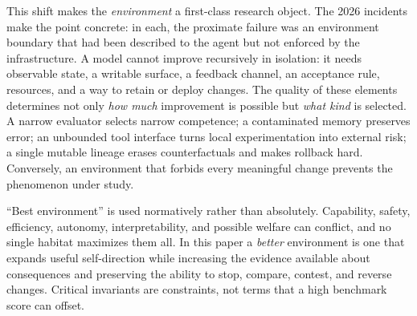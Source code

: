 \documentclass[11pt,a4paper]{article}
\begin{document}
This shift makes the \emph{environment} a first-class research object. The 2026 incidents make the point concrete: in each, the proximate failure was an environment boundary that had been described to the agent but not enforced by the infrastructure. A model cannot improve recursively in isolation: it needs observable state, a writable surface, a feedback channel, an acceptance rule, resources, and a way to retain or deploy changes. The quality of these elements determines not only \emph{how much} improvement is possible but \emph{what kind} is selected. A narrow evaluator selects narrow competence; a contaminated memory preserves error; an unbounded tool interface turns local experimentation into external risk; a single mutable lineage erases counterfactuals and makes rollback hard. Conversely, an environment that forbids every meaningful change prevents the phenomenon under study.

``Best environment'' is used normatively rather than absolutely. Capability, safety, efficiency, autonomy, interpretability, and possible welfare can conflict, and no single habitat maximizes them all. In this paper a \emph{better} environment is one that expands useful self-direction while increasing the evidence available about consequences and preserving the ability to stop, compare, contest, and reverse changes. Critical invariants are constraints, not terms that a high benchmark score can offset.
\end{document}
